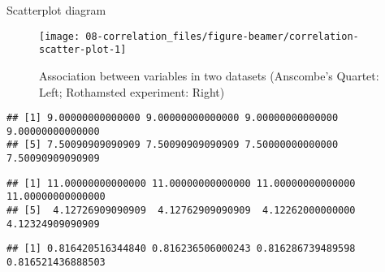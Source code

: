 \documentclass[
  ignorenonframetext,
  aspectratio=169]{beamer}
\begin{document}
\begin{frame}{Scatterplot diagram}
\protect\hypertarget{scatterplot-diagram}{}
\begin{figure}

{\centering \texttt{[image: 08-correlation\_files/figure-beamer/correlation-scatter-plot-1]} 

}

\caption{Association between variables in two datasets (Anscombe's Quartet: Left; Rothamsted experiment: Right)}\label{fig:correlation-scatter-plot}
\end{figure}
\end{frame}

\begin{frame}[fragile]{}
\protect\hypertarget{section-1}{}
\begin{verbatim}
## [1] 9.00000000000000 9.00000000000000 9.00000000000000 9.00000000000000
## [5] 7.50090909090909 7.50090909090909 7.50000000000000 7.50090909090909
\end{verbatim}

\begin{verbatim}
## [1] 11.00000000000000 11.00000000000000 11.00000000000000 11.00000000000000
## [5]  4.12726909090909  4.12762909090909  4.12262000000000  4.12324909090909
\end{verbatim}

\begin{verbatim}
## [1] 0.816420516344840 0.816236506000243 0.816286739489598 0.816521436888503
\end{verbatim}
\end{frame}
\end{document}
